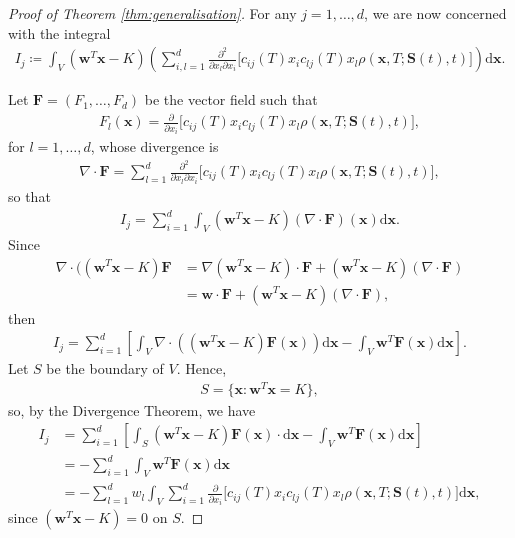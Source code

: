 \documentclass[english]{article}
\numberwithin{equation}{section}
\numberwithin{figure}{section}
\theoremstyle{bolddescit}
\theoremstyle{definition}
\theoremstyle{definition}
\theoremstyle{plain}
\theoremstyle{plain}
\theoremstyle{bolddesc}
\theoremstyle{plain}
\theoremstyle{remark}
\begin{document}
\begin{proof}[Proof of Theorem \ref{thm:generalisation}]
  For any $j = 1,\ldots,d$, we are now concerned with the integral
  \begin{align*}
    I_j \coloneq \int_V \left(\mathbf{w}^T \mathbf{x} - K\right) \left( \sum_{i,l=1}^{d} \frac{\partial^2}{\partial x_l \partial x_i}\big[c_{ij}(T) x_i c_{lj}(T) x_l \rho(\mathbf{x},T;\mathbf{S}(t),t)\big] \right) \mathrm{d}\mathbf{x}.
  \end{align*}

  Let $\mathbf{F} = (F_1,\ldots,F_d)$ be the vector field such that
  \begin{align*}
    F_l(\mathbf{x}) = \frac{\partial}{\partial x_i} \big[c_{ij}(T) x_i c_{lj}(T) x_l \rho(\mathbf{x},T;\mathbf{S}(t),t)\big],
  \end{align*}
  for $l=1,\ldots,d$, whose divergence is
  \begin{align*}
    \nabla \cdot \mathbf{F} = \sum_{l=1}^{d} \frac{\partial^2}{\partial x_l \partial x_i}\big[c_{ij}(T) x_i c_{lj}(T) x_l \rho(\mathbf{x},T;\mathbf{S}(t),t)\big],
  \end{align*}
  so that
  \begin{align*}
    I_j = \sum_{i=1}^{d} \int_V \left(\mathbf{w}^T \mathbf{x} - K\right) (\nabla \cdot \mathbf{F})(\mathbf{x}) \mathrm{d}\mathbf{x}.
  \end{align*}
  Since
  \begin{align*}
    \nabla \cdot ((\mathbf{w}^T \mathbf{x} - K) \mathbf{F}
    &= \nabla (\mathbf{w}^T \mathbf{x} - K) \cdot \mathbf{F} + (\mathbf{w}^T \mathbf{x} - K) (\nabla \cdot \mathbf{F})\\
    &= \mathbf{w} \cdot \mathbf{F} + (\mathbf{w}^T \mathbf{x} - K) (\nabla \cdot \mathbf{F}),
  \end{align*}
  then
  \begin{align*}
    I_j = \sum_{i=1}^{d} \left[\int_V \nabla \cdot \left(\left(\mathbf{w}^T \mathbf{x} - K\right) \mathbf{F}(\mathbf{x})\right) \mathrm{d}\mathbf{x} - \int_V \mathbf{w}^T \mathbf{F}(\mathbf{x}) \mathrm{d}\mathbf{x} \right].
  \end{align*}
  Let $S$ be the boundary of $V$. Hence,
  \begin{align*}
    S = \{\mathbf{x} : \mathbf{w}^T \mathbf{x} = K\},
  \end{align*}
  so, by the Divergence Theorem, we have
  \begin{align*}
    I_j &= \sum_{i=1}^{d} \left[\int_S \left(\mathbf{w}^T \mathbf{x} - K\right) \mathbf{F}(\mathbf{x}) \cdot \mathrm{d}\mathbf{x} - \int_V \mathbf{w}^T \mathbf{F}(\mathbf{x}) \mathrm{d}\mathbf{x} \right]\\
    &= - \sum_{i=1}^{d} \int_V \mathbf{w}^T \mathbf{F}(\mathbf{x}) \mathrm{d}\mathbf{x}\\
    &= - \sum_{l=1}^{d} w_l \int_V \sum_{i=1}^d \frac{\partial}{\partial x_i} \big[c_{ij}(T) x_i c_{lj}(T) x_l \rho(\mathbf{x},T;\mathbf{S}(t),t)\big] \mathrm{d}\mathbf{x},
  \end{align*}
  since $(\mathbf{w}^T \mathbf{x} - K) = 0$ on $S$.


\end{proof}
\end{document}

